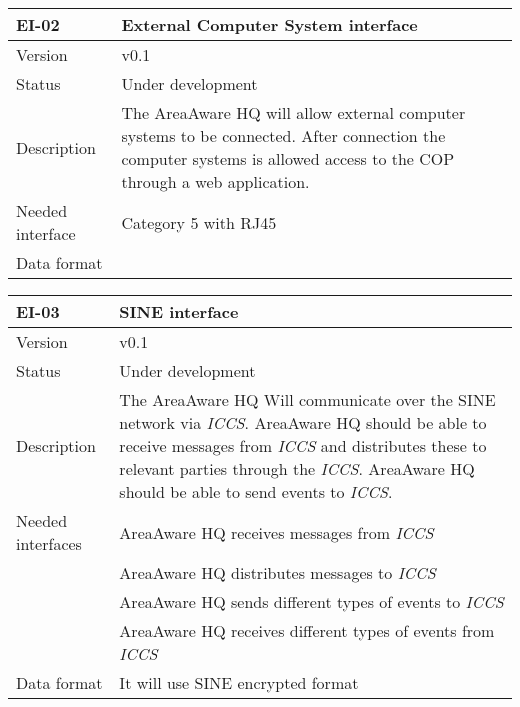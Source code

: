 \begin{longtable}{| p{3.5cm} |  p{10cm} | }
	\hline
	\textbf{EI-02} &  \textbf{External Computer System interface} \\
	\hline
	Version & v0.1 \\
	\hline
	Status & Under development \\
	\hline
	Description & The AreaAware HQ will allow external computer systems to be connected. After connection the computer systems is allowed access to the COP through a web application.	\\
	\hline
	Needed interface & Category 5 with RJ45 \\
	\hline
	Data format
	&  \\
	\hline
\end{longtable}

\begin{longtable}{| p{3.5cm} |  p{10cm} | }
	\hline
	\textbf{EI-03} &  \textbf{SINE interface} \\
	\hline
	Version & v0.1 \\
	\hline
	Status & Under development \\
	\hline
	Description & The AreaAware HQ Will communicate over the SINE network via \emph{ICCS}\citep{iccs}. AreaAware HQ should be able to receive messages from \emph{ICCS} and distributes these to relevant parties through the \emph{ICCS}. AreaAware HQ should be able to send events to \emph{ICCS}.
	\\
	\hline
	Needed interfaces 
	& AreaAware HQ receives messages from \emph{ICCS} \\
	& AreaAware HQ distributes messages to \emph{ICCS} \\
	& AreaAware HQ sends different types of events to \emph{ICCS} \\
	& AreaAware HQ receives different types of events from \emph{ICCS} \\
	\hline
	Data format
	& It will use SINE encrypted format  \\
	\hline
\end{longtable}

